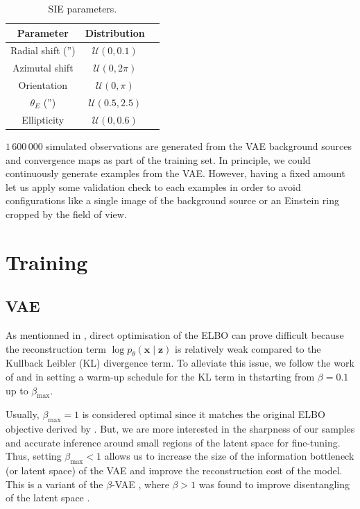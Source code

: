 \begin{table}[htb!]
\centering
\caption{SIE parameters.}
\label{tab:sie}
\begin{tabular}{ccc}
        Parameter &  Distribution \\
        \hline \hline
         Radial shift ('') & $\mathcal{U}(0, 0.1)$ \\
        Azimutal shift & $\mathcal{U}(0, 2\pi)$ \\
        Orientation & $\mathcal{U}(0, \pi)$ \\
        $\theta_E$ ('') & $\mathcal{U}(0.5, 2.5)$ \\
        Ellipticity & $\mathcal{U}(0, 0.6)$ \\
        \hline
\end{tabular}
\end{table}


$1\,600\,000$ simulated observations are generated from the VAE 
background sources and convergence maps as part of the training set. 
In principle, we could continuously generate examples from the VAE. 
However, having a fixed amount let us apply some validation check to each 
examples in order to avoid configurations like a
single image of the background 
source or an Einstein ring cropped by the field of view.




\section{Training}\label{sec:training}

\subsection{VAE}\label{sec:vae training}

As mentionned in \citet{Kingma2019}, direct optimisation 
of the ELBO can prove difficult because the reconstruction term $\log p_\theta (\mathbf{x} \mid \mathbf{z})$ 
is relatively weak compared to the Kullback Leibler (KL) divergence term. To alleviate this issue, 
we follow the work of \citet{Bowman2015} and \citet{Sonderby2016} in setting a warm-up 
schedule for the KL term in thstarting from $\beta=0.1$ up to $\beta_{\mathrm{max}}$. 

Usually, 
$\beta_{\mathrm{max}} = 1$ is considered optimal since it matches the original ELBO  
objective derived by \citet{Kingma2013}. 
But, we are more interested in the 
sharpness of our samples and accurate inference around small regions of the latent 
space for fine-tuning. Thus, setting $\beta_{\mathrm{max}} < 1$ allows us to increase 
the size of the information bottleneck (or latent space) of the VAE 
and improve the reconstruction cost of the model. 
This is a variant of the $\beta$-VAE \citep{Higgins2017}, where $\beta > 1$ was found 
to improve disentangling of the latent space \citep{Burgess2018}. 

